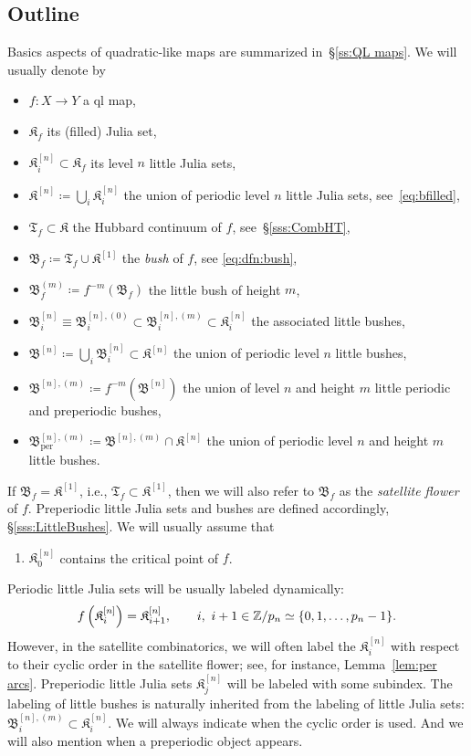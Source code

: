 \documentclass{amsart}
\newcommand{\bfilled}{{\boldsymbol{\mathfrak K} }}
\newcommand{\filled}{{\mathfrak K }}
\newcommand{\Hub}{{\mathfrak T}}
\newcommand{\per}{{\operatorname{per}}}
\newcommand{\bush}{{\mathfrak B }}
\newcommand{\bbush}{{\boldsymbol {\mathfrak B} }}
\renewcommand{\sp}{{\ \ }}
\newcommand{\1}{{\mathbb 1 }}
\begin{document}
\subsection{Outline} Basics aspects of quadratic-like maps are summarized in~\S\ref{ss:QL maps}. We will usually denote by
\begin{itemize}
\item $f\colon X\to Y$ a ql map,
\item $\filled_f$ its (filled) Julia set, 
\item $\filled^{[n]}_i\subset \filled_f$ its level $n$ little Julia sets,
\item $\bfilled^{[n]}\coloneqq \bigcup_i \filled^{[n]}_i$ the union of periodic level $n$ little Julia sets, see~\eqref{eq:bfilled},
\item $\Hub_f\subset \filled$ the Hubbard continuum of $f$, see~\S\ref{sss:CombHT},
\item $\bush_f\coloneqq \Hub_f \cup \bfilled^{[1]}$ the \emph{bush} of $f$, see \eqref{eq:dfn:bush},
\item $\bush_f^{(m)}\coloneqq f^{-m}(\bush_f)$ the little bush of height $m$,
\item $\bush^{[n]}_i \equiv \bush^{[n],(0)}_i\subset \bush^{[n],(m)}_i\subset \filled^{[n]}_i$ the associated little bushes,
\item $\bbush^{[n]}\coloneqq \bigcup_i \bush^{[n]}_i\subset \bfilled^{[n]}$ the union of periodic level $n$ little bushes,
\item $\bbush^{[n],(m)}\coloneqq f^{-m} \left(\bbush^{[n]}\right)$ the union of level $n$ and height $m$ little periodic and preperiodic bushes,
\item $\bbush^{[n],(m)}_\per\coloneqq\bbush^{[n],(m)} \cap \bfilled^{[n]}$ the union of periodic level $n$ and height $m$ little bushes.
\end{itemize}
If $\bush_f =\bfilled^{[1]}$, i.e., $\Hub_f \subset \bfilled^{[1]}$, then we will also refer to $\bush_f $ as the \emph{satellite flower} of $f$. Preperiodic little Julia sets and bushes are defined accordingly, \S\ref{sss:LittleBushes}. We will usually assume that
\begin{enumerate}[label=\text{(\Alph*)},start=15, font=\normalfont,leftmargin=*]
\item \label{CrtPoint} $\filled^{[n]}_0$ contains the critical point of $f$.
\end{enumerate}
Periodic little Julia sets will be usually labeled dynamically:
\[f\left(\filled^{[n]}_i\right)=\filled^{[n]}_{i+1},\sp\sp\sp i,\ i+1\in \Z/{p_n}\simeq\{0,1,\dots, p_n-1\}.\]
However, in the satellite combinatorics, we will often label the $\filled^{[n]}_i$ with respect to their cyclic order in the satellite flower; see, for instance, Lemma~\ref{lem:per arcs}. Preperiodic little Julia sets $\filled^{[n]}_j$ will be labeled with some subindex.  The labeling of little bushes is naturally inherited from the labeling of little Julia sets: $ \bush^{[n],(m)}_i\subset \filled^{[n]}_i$. We will always indicate when the cyclic order is used. And we will also mention when a preperiodic object appears.
\end{document}
